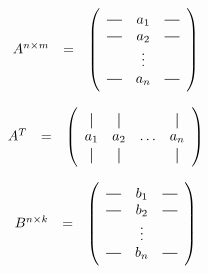 \documentclass{article}
\theoremstyle{definition}
\newcommand*{\vertbar}{\rule[-1ex]{0.5pt}{2.5ex}}
\newcommand*{\horzbar}{\rule[.5ex]{2.5ex}{0.5pt}}
\begin{document}
\bigskip
\begin{equation*}
\begin{array}{llll}
A^{n \times m} 
&=& \left (
		\begin{array}{ccc}
		\horzbar & a_{1} & \horzbar \\
		\horzbar & a_{2} & \horzbar \\
				 & \vdots    &          \\
		\horzbar & a_{n} & \horzbar
	\end{array}
	\right )
\end{array}
\end{equation*}

\bigskip

\begin{equation*}
\begin{array}{llll}
A^{T}
&=& \left (
	\begin{array}{cccc}
		\vertbar & \vertbar &        & \vertbar \\
		a_{1}    & a_{2}    & \ldots & a_{n}    \\
		\vertbar & \vertbar &        & \vertbar 
	\end{array}
	\right )
\end{array}
\end{equation*}


\bigskip
\setlength{\extrarowheight}{1ex}


\begin{equation*}
\begin{array}{llll}
B^{n \times k} 
&=& \left (
		\begin{array}{ccc}
		\horzbar & b_{1} & \horzbar \\
		\horzbar & b_{2} & \horzbar \\
				 & \vdots    &          \\
		\horzbar & b_{n} & \horzbar
	\end{array}
	\right )
\end{array}
\end{equation*}
\end{document}
